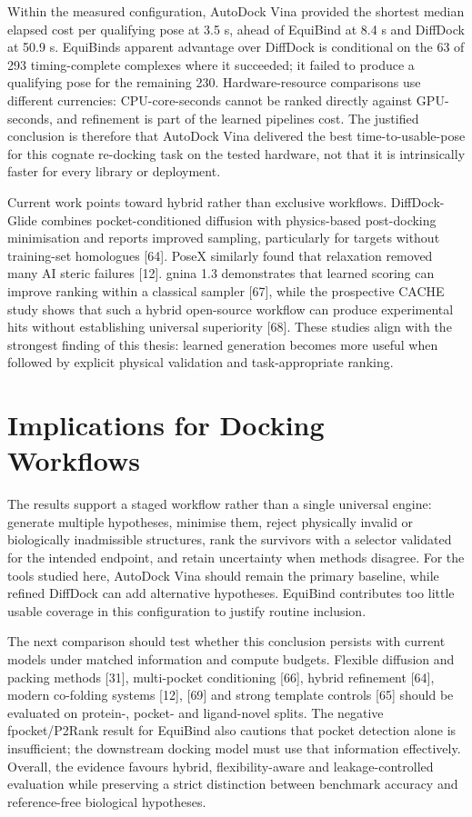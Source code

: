 Within the measured configuration, AutoDock Vina provided the shortest median elapsed cost per qualifying pose at 3.5 s, ahead of EquiBind at 8.4 s and DiffDock at 50.9 s. EquiBind\textquotesingle s apparent advantage over DiffDock is conditional on the 63 of 293 timing-complete complexes where it succeeded; it failed to produce a qualifying pose for the remaining 230. Hardware-resource comparisons use different currencies: CPU-core-seconds cannot be ranked directly against GPU-seconds, and refinement is part of the learned pipelines\textquotesingle{} cost. The justified conclusion is therefore that AutoDock Vina delivered the best time-to-usable-pose for this cognate re-docking task on the tested hardware, not that it is intrinsically faster for every library or deployment.

Current work points toward hybrid rather than exclusive workflows. DiffDock-Glide combines pocket-conditioned diffusion with physics-based post-docking minimisation and reports improved sampling, particularly for targets without training-set homologues {[}64{]}. PoseX similarly found that relaxation removed many AI steric failures {[}12{]}. gnina 1.3 demonstrates that learned scoring can improve ranking within a classical sampler {[}67{]}, while the prospective CACHE study shows that such a hybrid open-source workflow can produce experimental hits without establishing universal superiority {[}68{]}. These studies align with the strongest finding of this thesis: learned generation becomes more useful when followed by explicit physical validation and task-appropriate ranking.

\hypertarget{implications-for-docking-workflows}{%
\section{Implications for Docking Workflows}\label{implications-for-docking-workflows}}

The results support a staged workflow rather than a single universal engine: generate multiple hypotheses, minimise them, reject physically invalid or biologically inadmissible structures, rank the survivors with a selector validated for the intended endpoint, and retain uncertainty when methods disagree. For the tools studied here, AutoDock Vina should remain the primary baseline, while refined DiffDock can add alternative hypotheses. EquiBind contributes too little usable coverage in this configuration to justify routine inclusion.

The next comparison should test whether this conclusion persists with current models under matched information and compute budgets. Flexible diffusion and packing methods {[}31{]}, multi-pocket conditioning {[}66{]}, hybrid refinement {[}64{]}, modern co-folding systems {[}12{]}, {[}69{]} and strong template controls {[}65{]} should be evaluated on protein-, pocket- and ligand-novel splits. The negative fpocket/P2Rank result for EquiBind also cautions that pocket detection alone is insufficient; the downstream docking model must use that information effectively. Overall, the evidence favours hybrid, flexibility-aware and leakage-controlled evaluation while preserving a strict distinction between benchmark accuracy and reference-free biological hypotheses.

